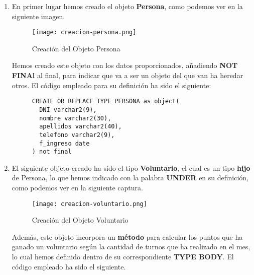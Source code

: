 \begin{enumerate}[label=\alph*)]
    \item En primer lugar hemos creado el objeto \textbf{Persona}, como podemos ver en la siguiente imagen.

    \begin{figure}[H]
        \centering
        \texttt{[image: creacion-persona.png]}
        \caption{Creación del Objeto Persona}
    \end{figure}

    Hemos creado este objeto con los datos proporcionados, añadiendo \textbf{NOT FINAl} al final, para indicar que va a ser un objeto del que van ha heredar otros. El código empleado para su definición ha sido el siguiente:

    \begin{figure}[H]
        \begin{tcolorbox}[sharp corners, colback=yellow!30, colframe=white!20]
            \tiny
            \begin{verbatim}
CREATE OR REPLACE TYPE PERSONA as object(
  DNI varchar2(9),
  nombre varchar2(30),
  apellidos varchar2(40),
  telefono varchar2(9),
  f_ingreso date
) not final
            \end{verbatim}
        \end{tcolorbox}
    \end{figure}

    \item El siguiente objeto creado ha sido el tipo \textbf{Voluntario}, el cual es un tipo \textbf{hijo} de Persona, lo que hemos indicado con la palabra \textbf{UNDER} en su definición, como podemos ver en la siguiente captura.

    \begin{figure}[H]
        \centering
        \texttt{[image: creacion-voluntario.png]}
        \caption{Creación del Objeto Voluntario}
    \end{figure}

    Además, este objeto incorpora un \textbf{método} para calcular los puntos que ha ganado un voluntario según la cantidad de turnos que ha realizado en el mes, lo cual hemos definido dentro de su correspondiente \textbf{TYPE BODY}. El código empleado ha sido el siguiente.

    \begin{figure}[H]
        \begin{tcolorbox}[sharp corners, colback=yellow!30, colframe=white!20]
            \tiny
            \begin{verbatim}


\end{verbatim}
\end{tcolorbox}
\end{figure}
\end{enumerate}
